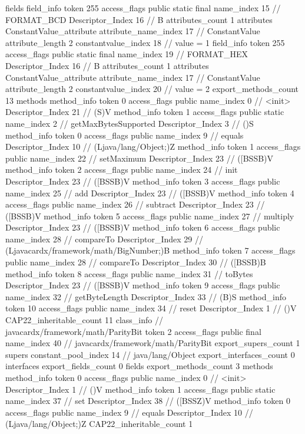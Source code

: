 {{{			fields {
			field_info {
				token	255
				access_flags	public static final
				name_index	15		// FORMAT_BCD
				Descriptor_Index	16		// B
				attributes_count	1
				attributes {
				ConstantValue_attribute {
					attribute_name_index	17		// ConstantValue
					attribute_length	2
					constantvalue_index	18		// value = 1
				}
				}
			}
			field_info {
				token	255
				access_flags	public static final
				name_index	19		// FORMAT_HEX
				Descriptor_Index	16		// B
				attributes_count	1
				attributes {
				ConstantValue_attribute {
					attribute_name_index	17		// ConstantValue
					attribute_length	2
					constantvalue_index	20		// value = 2
				}
				}
			}
			}
			export_methods_count	13
			methods {
				method_info {
					token	0
					access_flags	public
					name_index	0		// <init>
					Descriptor_Index	21		// (S)V
				}
				method_info {
					token	1
					access_flags	public static
					name_index	2		// getMaxBytesSupported
					Descriptor_Index	3		// ()S
				}
				method_info {
					token	0
					access_flags	public
					name_index	9		// equals
					Descriptor_Index	10		// (Ljava/lang/Object;)Z
				}
				method_info {
					token	1
					access_flags	public
					name_index	22		// setMaximum
					Descriptor_Index	23		// ([BSSB)V
				}
				method_info {
					token	2
					access_flags	public
					name_index	24		// init
					Descriptor_Index	23		// ([BSSB)V
				}
				method_info {
					token	3
					access_flags	public
					name_index	25		// add
					Descriptor_Index	23		// ([BSSB)V
				}
				method_info {
					token	4
					access_flags	public
					name_index	26		// subtract
					Descriptor_Index	23		// ([BSSB)V
				}
				method_info {
					token	5
					access_flags	public
					name_index	27		// multiply
					Descriptor_Index	23		// ([BSSB)V
				}
				method_info {
					token	6
					access_flags	public
					name_index	28		// compareTo
					Descriptor_Index	29		// (Ljavacardx/framework/math/BigNumber;)B
				}
				method_info {
					token	7
					access_flags	public
					name_index	28		// compareTo
					Descriptor_Index	30		// ([BSSB)B
				}
				method_info {
					token	8
					access_flags	public
					name_index	31		// toBytes
					Descriptor_Index	23		// ([BSSB)V
				}
				method_info {
					token	9
					access_flags	public
					name_index	32		// getByteLength
					Descriptor_Index	33		// (B)S
				}
				method_info {
					token	10
					access_flags	public
					name_index	34		// reset
					Descriptor_Index	1		// ()V
				}
			}
			CAP22_inheritable_count	11
		}
		class_info {		// javacardx/framework/math/ParityBit
			token	2
			access_flags	public final
			name_index	40		// javacardx/framework/math/ParityBit
			export_supers_count	1
			supers {
				constant_pool_index	14		// java/lang/Object
			}
			export_interfaces_count	0
			interfaces {
			}
			export_fields_count	0
			fields {
			}
			export_methods_count	3
			methods {
				method_info {
					token	0
					access_flags	public
					name_index	0		// <init>
					Descriptor_Index	1		// ()V
				}
				method_info {
					token	1
					access_flags	public static
					name_index	37		// set
					Descriptor_Index	38		// ([BSSZ)V
				}
				method_info {
					token	0
					access_flags	public
					name_index	9		// equals
					Descriptor_Index	10		// (Ljava/lang/Object;)Z
				}
			}
			CAP22_inheritable_count	1
		}
	}
}
